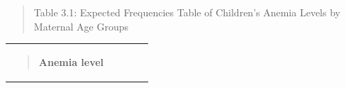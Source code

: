 \begin{quote}
Table 3.1: Expected Frequencies Table of Children's Anemia Levels by
Maternal Age Groups
\end{quote}

{\def\LTcaptype{none} %
\begin{longtable}[]{@{}
  >{\raggedright\arraybackslash}p{}
  >{\raggedright\arraybackslash}p{}
  >{\raggedright\arraybackslash}p{}
  >{\raggedright\arraybackslash}p{}
  >{\raggedright\arraybackslash}p{}@{}}
\toprule\noalign{}
\begin{minipage}[b]{\linewidth}\raggedright
\begin{quote}
\textbf{Anemia level}


\end{quote}
\end{minipage}
\end{longtable}}
